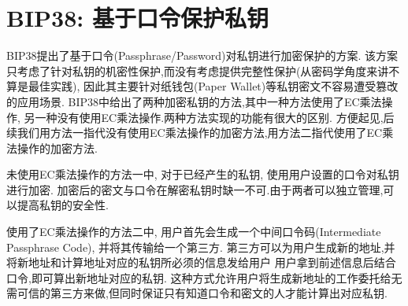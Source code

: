 \section{BIP38: 基于口令保护私钥}

BIP38提出了基于口令(Passphrase/Password)对私钥进行加密保护的方案.
该方案只考虑了针对私钥的机密性保护,而没有考虑提供完整性保护(从密码学角度来讲不算是最佳实践),
因此其主要针对纸钱包(Paper Wallet)等私钥密文不容易遭受篡改的应用场景.
BIP38中给出了两种加密私钥的方法,其中一种方法使用了EC乘法操作,
另一种没有使用EC乘法操作.两种方法实现的功能有很大的区别.
方便起见,后续我们用方法一指代没有使用EC乘法操作的加密方法,用方法二指代使用了EC乘法操作的加密方法.

未使用EC乘法操作的方法一中, 对于已经产生的私钥, 使用用户设置的口令对私钥进行加密.
加密后的密文与口令在解密私钥时缺一不可.由于两者可以独立管理,可以提高私钥的安全性.

使用了EC乘法操作的方法二中, 用户首先会生成一个中间口令码(Intermediate Passphrase Code),
并将其传输给一个第三方.
第三方可以为用户生成新的地址,并将新地址和计算地址对应的私钥所必须的信息发给用户
用户拿到前述信息后结合口令,即可算出新地址对应的私钥.
这种方式允许用户将生成新地址的工作委托给无需可信的第三方来做,但同时保证只有知道口令和密文的人才能计算出对应私钥.

%
%
%
%

